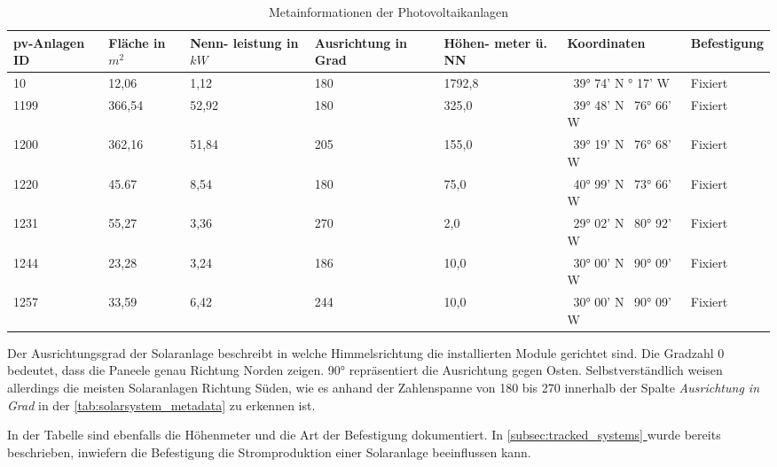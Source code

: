 \documentclass[12pt, a4paper]{article}
\newcommand*{\fullref}[1]{\hyperref[{#1}]{\autoref*{#1} \textit{\nameref*{#1}}}}
\begin{document}
\begin{table}[H]
\begin{center}
\begin{tabular}{| p{1.4cm} | p{1.3cm} | p{1.4cm} | p{2.1cm}  | p{1.5cm} | p{2.1cm} | p{2.1cm} |}
\hline
\ac{pv}-Anlagen ID & Fläche in $m^2$ & Nenn- leistung in $kW$ & Ausrichtung in Grad & Höhen- meter ü. NN & Koordinaten & Befestigung \\ \hline
  10 &  12,06 &   1,12 & 180 & 1792,8 & \ 39° 74' N \newline   105° 17' W & Fixiert \\ \hline
1199 & 366,54 &  52,92 & 180 &  325,0 & \ 39° 48' N \newline \  76° 66' W & Fixiert \\ \hline
1200 & 362,16 &  51,84 & 205 &  155,0 & \ 39° 19' N \newline \  76° 68' W & Fixiert \\ \hline
1220 &  45.67 &   8,54 & 180 &   75,0 & \ 40° 99' N \newline \  73° 66' W & Fixiert \\ \hline
1231 &  55,27 &   3,36 & 270 &    2,0 & \ 29° 02' N \newline \  80° 92' W & Fixiert \\ \hline
1244 &  23,28 &   3,24 & 186 &   10,0 & \ 30° 00' N \newline \  90° 09' W & Fixiert \\ \hline
1257 &  33,59 &   6,42 & 244 &   10,0 & \ 30° 00' N \newline \  90° 09' W & Fixiert \\ \hline

\end{tabular}
\end{center}
\caption{Metainformationen der Photovoltaikanlagen}
\label{tab:solarsystem_metadata} 
\end{table}

Der Ausrichtungsgrad der Solaranlage beschreibt in welche Himmelsrichtung die installierten Module gerichtet sind. Die Gradzahl 0 bedeutet, dass die Paneele genau Richtung Norden zeigen. 90° repräsentiert die Ausrichtung gegen Osten. Selbstverständlich weisen allerdings die meisten Solaranlagen Richtung Süden, wie es anhand der Zahlenspanne von 180 bis 270 innerhalb der Spalte \textit{Ausrichtung in Grad} in der \autoref{tab:solarsystem_metadata} zu erkennen ist.

In der Tabelle sind ebenfalls die Höhenmeter und die Art der Befestigung dokumentiert. In \fullref{subsec:tracked_systems} wurde bereits beschrieben, inwiefern die Befestigung die Stromproduktion einer Solaranlage beeinflussen kann. 
\end{document}
